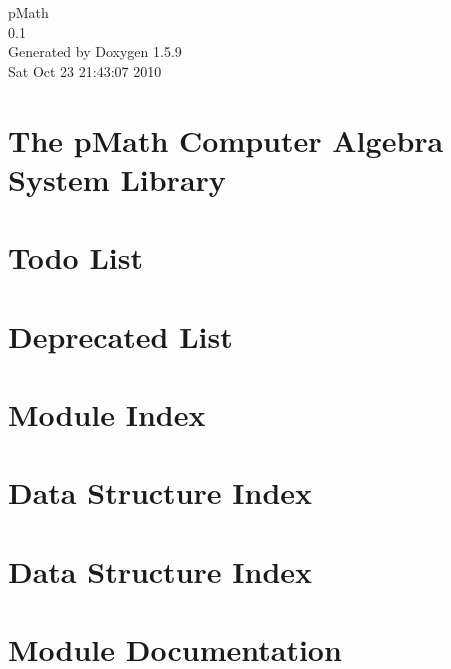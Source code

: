 \documentclass[a4paper]{article}
\begin{document}
\hypersetup{pageanchor=false}
\begin{titlepage}
\vspace*{7cm}
\begin{center}
{\Large pMath \\[1ex]\large 0.1 }\\
\vspace*{1cm}
{\large Generated by Doxygen 1.5.9}\\
\vspace*{0.5cm}
{\small Sat Oct 23 21:43:07 2010}\\
\end{center}
\end{titlepage}
\tableofcontents
{}
\hypersetup{pageanchor=true}
\section{The pMath Computer Algebra System Library}
\label{index}\hypertarget{index}{}
\section{Todo List}
\label{todo}
\hypertarget{todo}{}

\section{Deprecated List}
\label{deprecated}
\hypertarget{deprecated}{}

\section{Module Index}

\section{Data Structure Index}

\section{Data Structure Index}

\section{Module Documentation}




















\end{document}
